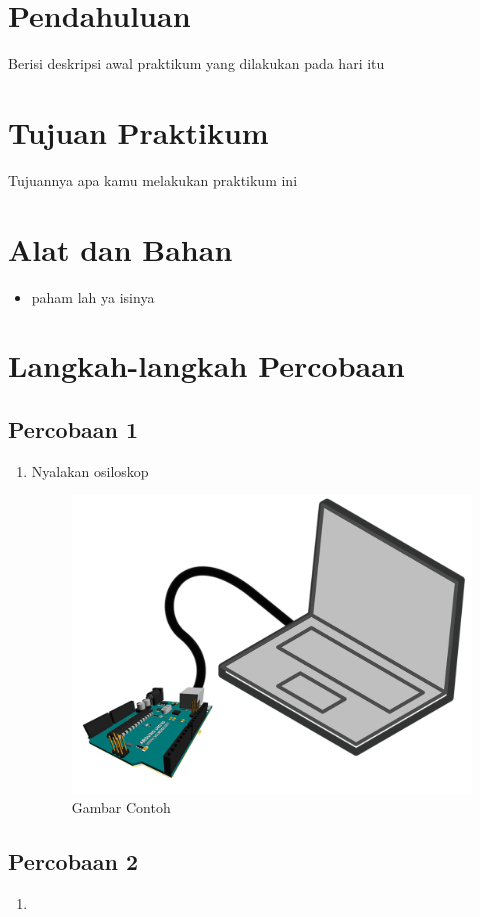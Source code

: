 \section{Pendahuluan}
Berisi deskripsi awal praktikum yang dilakukan pada hari itu
\section{Tujuan Praktikum}
Tujuannya apa kamu melakukan praktikum ini
\section{Alat dan Bahan}
\begin{itemize}[label=$\bullet$, itemsep=-1pt, leftmargin=*]
	\item paham lah ya isinya
\end{itemize}
\section{Langkah-langkah Percobaan}

\subsection{Percobaan 1}
\begin{enumerate}
	\item Nyalakan osiloskop
	\begin{figure}[H]
		\centering
		\includegraphics[width=0.5\linewidth]{P1/img/image 1.png}
		\caption{Gambar Contoh}
		\label{fig:gambar1}
	\end{figure}
\end{enumerate}

\subsection{Percobaan 2}
\begin{enumerate}
	\item 
\end{enumerate}

